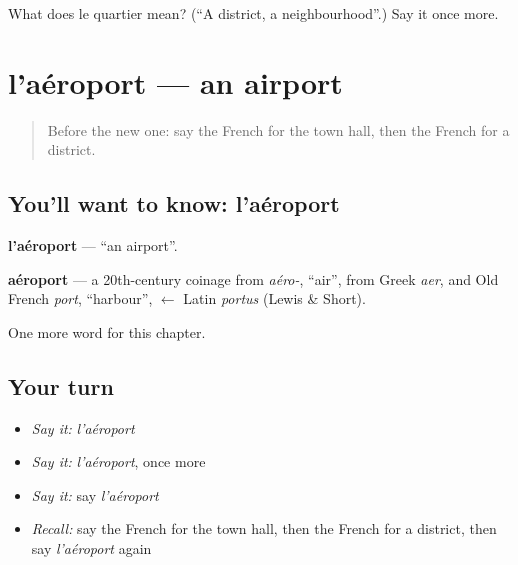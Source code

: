 \begin{tcolorbox}[breakable,colback=teal!4,colframe=teal!35!black,title={Before you move on}]
What does le quartier mean? (\textquotedblleft{}A district, a neighbourhood\textquotedblright{}.) Say it once more.
\end{tcolorbox}
\section[l'aéroport]{l'aéroport — an airport}

\label{lesson:FR-C103-aeroport}



\begin{quote}
Before the new one: say the French for the town hall, then the French for a district.
\end{quote}

\subsection*{You'll want to know: l'aéroport}
\textbf{l'aéroport} — \textquotedblleft{}an airport\textquotedblright{}.

\begin{cousinweb}
\textbf{aéroport} — a 20th-century coinage from \emph{aéro-}, \textquotedblleft{}air\textquotedblright{}, from Greek \emph{aer}, and Old French \emph{port}, \textquotedblleft{}harbour\textquotedblright{}, $\leftarrow$ Latin \emph{portus} (Lewis \& Short).
\end{cousinweb}

\begin{grammarlens}[title={What you've built}]
One more word for this chapter.
\end{grammarlens}

\subsection*{Your turn}
\begin{itemize}
\raggedright
  \item \emph{Say it:} \emph{l'aéroport}
  \item \emph{Say it:} \emph{l'aéroport}, once more
  \item \emph{Say it:} say \emph{l'aéroport}
  \item \emph{Recall:} say the French for the town hall, then the French for a district, then say \emph{l'aéroport} again
\end{itemize}

